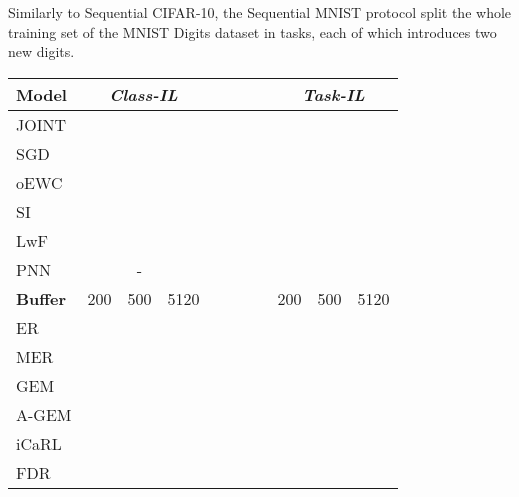 \documentclass{article}
\begin{document}
Similarly to Sequential CIFAR-10, the Sequential MNIST protocol split the whole training set of the MNIST Digits dataset in  tasks, each of which introduces two new digits.
\begin{table}[H]
\centering
{
\setlength{\tabcolsep}{2.0pt}
\begin{tabular}{lccccccc}
\toprule
\textbf{Model}          & \multicolumn{3}{c}{\textit{Class-IL}} &~~~~~&   \multicolumn{3}{c}{\textit{Task-IL}}  \\
\midrule
JOINT                   &                         & \tiny{} &                         &      &                         & \tiny{} &                       \\
SGD                     &                         & \tiny{} &                         &      &                         & \tiny{} &                       \\
\midrule
oEWC                    &                         & \tiny{} &                         &      &                         & \tiny{} &                       \\
SI                      &                         & \tiny{} &                         &      &                         & \tiny{} &                       \\
LwF                     &                         & \tiny{} &                         &      &                         & \tiny{} &                       \\
PNN                     &                         & -                       &                         &      &                         & \tiny{} &                       \\
\midrule
\textbf{Buffer}         & 200   & 500   & 5120 &                & 200   & 500   & 5120                  \\
\midrule
ER                      & \tiny{} & \tiny{} & \tiny{} &      & \tiny{} & \tiny{} & \tiny{} \\
MER                     & \tiny{} & \tiny{} & \tiny{} &      & \tiny{} & \tiny{} & \tiny{} \\
GEM                     & \tiny{} & \tiny{} & \tiny{} &      & \tiny{} & \tiny{} & \tiny{} \\
A-GEM                   & \tiny{} & \tiny{} & \tiny{} &      & \tiny{} & \tiny{} & \tiny{} \\
iCaRL                   & \tiny{} & \tiny{} & \tiny{} &      & \tiny{} & \tiny{} & \tiny{} \\
FDR                     & \tiny{} & \tiny{} & \tiny{} &      & \tiny{} & \tiny{} & \tiny{} \\

\end{tabular}}
\end{table}
\end{document}
